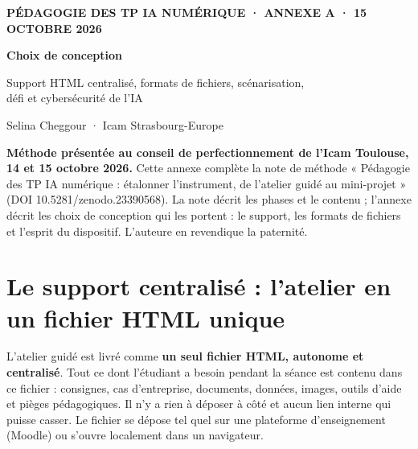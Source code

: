 \documentclass[11pt,a4paper]{article}
\newcommand{\auteure}{Selina Cheggour}
\newcommand{\presente}{Méthode présentée au conseil de perfectionnement de l'Icam Toulouse, 14 et 15 octobre 2026}
\begin{document}
\thispagestyle{plain}

{\scriptsize\bfseries\color{icamred}PÉDAGOGIE DES TP IA NUMÉRIQUE · ANNEXE A · 15 OCTOBRE 2026}\par\vspace{3mm}
{\selectfont\fontsize{22}{27}\selectfont\bfseries Choix de conception\par}
\vspace{1mm}
{\large\color{icamgray}Support HTML centralisé, formats de fichiers, scénarisation,\\ défi et cybersécurité de l'IA\par}
\vspace{2mm}
{\color{icamgray}\auteure{} · Icam Strasbourg-Europe}\par
\vspace{4mm}
\begin{cadre}
\textbf{\presente.} Cette annexe complète la note de méthode « Pédagogie des TP IA numérique :
étalonner l'instrument, de l'atelier guidé au mini-projet » (DOI 10.5281/zenodo.23390568). La note
décrit les phases et le contenu ; l'annexe décrit les choix de conception qui les portent : le
support, les formats de fichiers et l'esprit du dispositif. L'auteure en revendique la paternité.
\end{cadre}

\section{Le support centralisé : l'atelier en un fichier HTML unique}

L'atelier guidé est livré comme \textbf{un seul fichier HTML, autonome et centralisé}. Tout ce
dont l'étudiant a besoin pendant la séance est contenu dans ce fichier : consignes, cas
d'entreprise, documents, données, images, outils d'aide et pièges pédagogiques. Il n'y a rien à
déposer à côté et aucun lien interne qui puisse casser. Le fichier se dépose tel quel sur une
plateforme d'enseignement (Moodle) ou s'ouvre localement dans un navigateur.
\end{document}
